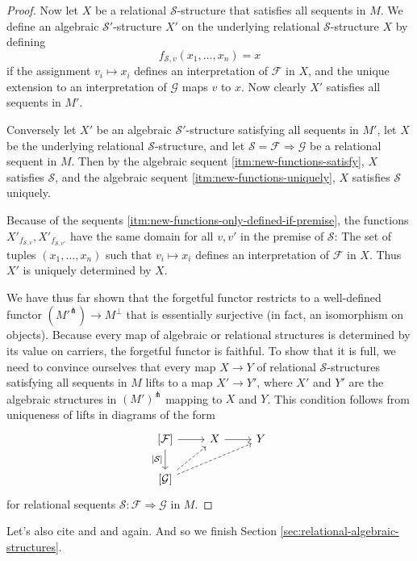 \documentclass[a4paper]{article}
\theoremstyle{remark}
\theoremstyle{definition}
\begin{document}
\begin{proof}
  Now let $X$ be a relational $\mathcal{S}$-structure that satisfies all sequents in $M$.
  We define an algebraic $\mathcal{S}'$-structure $X'$ on the underlying relational $\mathcal{S}$-structure $X$ by defining
  \begin{equation}
    f_{\mathcal{S}, v}(x_1, \dots, x_n) = x
  \end{equation}
  if the assignment $v_i \mapsto x_i$ defines an interpretation of $\mathcal{F}$ in $X$, and the unique extension to an interpretation of $\mathcal{G}$ maps $v$ to $x$.
  Now clearly $X'$ satisfies all sequents in $M'$.
  
  Conversely let $X'$ be an algebraic $\mathcal{S}'$-structure satisfying all sequents in $M'$, let $X$ be the underlying relational $\mathcal{S}$-structure, and let $\mathcal{S} = \mathcal{F} \Rightarrow \mathcal{G}$ be a relational sequent in $M$.
  Then by the algebraic sequent \ref{itm:new-functions-satisfy}, $X$ satisfies $\mathcal{S}$, and the algebraic sequent \ref{itm:new-functions-uniquely}, $X$ satisfies $\mathcal{S}$ uniquely.

  Because of the sequents \ref{itm:new-functions-only-defined-if-premise}, the functions $X'_{f_{\mathcal{S}, v}}, X'_{f_{\mathcal{S}, v'}}$ have the same domain for all $v, v'$ in the premise of $\mathcal{S}$:
  The set of tuples $(x_1, \dots, x_n)$ such that $v_i \mapsto x_i$ defines an interpretation of $\mathcal{F}$ in $X$.
  Thus $X'$ is uniquely determined by $X$.

  We have thus far shown that the forgetful functor restricts to a well-defined functor $(M'^\pitchfork) \rightarrow M^\perp$ that is essentially surjective (in fact, an isomorphism on objects).
  Because every map of algebraic or relational structures is determined by its value on carriers, the forgetful functor is faithful.
  To show that it is full, we need to convince ourselves that every map $X \rightarrow Y$ of relational $\mathcal{S}$-structures satisfying all sequents in $M$ lifts to a map $X' \rightarrow Y'$, where $X'$ and $Y'$ are the algebraic structures in $(M')^\pitchfork$ mapping to $X$ and $Y$.
  This condition follows from uniqueness of lifts in diagrams of the form
  \begin{equation}
    \begin{tikzcd}
      \left[ \mathcal{F} \right] \arrow[d, "{[\mathcal{S}]}"'] \arrow[r] & X \arrow[r] & Y \\
      \left[ \mathcal{G} \right] \arrow[ur, dashed] \arrow[urr, dashed]
    \end{tikzcd}
  \end{equation}
  for relational sequents $\mathcal{S} : \mathcal{F} \Rightarrow \mathcal{G}$ in $M$.
\end{proof}

Let's also cite \cite{marked-objects} and \cite{egg} and \cite{marked-objects} again.
And so we finish Section \ref{sec:relational-algebraic-structures}.



\end{document}
